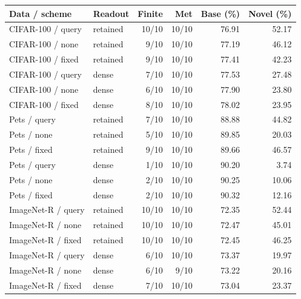 \begin{tabular}{@{}llrrrr@{}}
\toprule
Data / scheme & Readout & Finite & Met & Base (\%) & Novel (\%) \\
\midrule
CIFAR-100 / query & retained & 10/10 & 10/10 & 76.91 & 52.17 \\
CIFAR-100 / none & retained & 9/10 & 10/10 & 77.19 & 46.12 \\
CIFAR-100 / fixed & retained & 9/10 & 10/10 & 77.41 & 42.23 \\
CIFAR-100 / query & dense & 7/10 & 10/10 & 77.53 & 27.48 \\
CIFAR-100 / none & dense & 6/10 & 10/10 & 77.90 & 23.80 \\
CIFAR-100 / fixed & dense & 8/10 & 10/10 & 78.02 & 23.95 \\
\midrule
Pets / query & retained & 7/10 & 10/10 & 88.88 & 44.82 \\
Pets / none & retained & 5/10 & 10/10 & 89.85 & 20.03 \\
Pets / fixed & retained & 9/10 & 10/10 & 89.66 & 46.57 \\
Pets / query & dense & 1/10 & 10/10 & 90.20 & 3.74 \\
Pets / none & dense & 2/10 & 10/10 & 90.25 & 10.06 \\
Pets / fixed & dense & 2/10 & 10/10 & 90.32 & 12.16 \\
\midrule
ImageNet-R / query & retained & 10/10 & 10/10 & 72.35 & 52.44 \\
ImageNet-R / none & retained & 10/10 & 10/10 & 72.47 & 45.01 \\
ImageNet-R / fixed & retained & 10/10 & 10/10 & 72.45 & 46.25 \\
ImageNet-R / query & dense & 6/10 & 10/10 & 73.37 & 19.97 \\
ImageNet-R / none & dense & 6/10 & 9/10 & 73.22 & 20.16 \\
ImageNet-R / fixed & dense & 7/10 & 10/10 & 73.04 & 23.37 \\
\bottomrule
\end{tabular}
